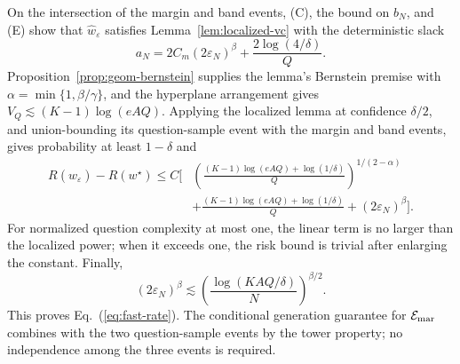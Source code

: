 On the intersection of the margin and band events, (C), the bound on \(b_N\),
and (E) show that
\(\widehat w_\varepsilon\) satisfies Lemma~\ref{lem:localized-vc} with the
deterministic slack
\[
a_N
=
2C_m(2\varepsilon_N)^\beta
+
\frac{2\log(4/\delta)}{Q}.
\]
Proposition~\ref{prop:geom-bernstein} supplies the lemma's Bernstein premise
with \(\alpha=\min\{1,\beta/\gamma\}\), and the hyperplane arrangement gives
\(V_Q\lesssim(K-1)\log(eAQ)\).  Applying the localized lemma at confidence
\(\delta/2\), and union-bounding its question-sample event with the margin and
band events, gives probability at least \(1-\delta\) and
\[
\begin{aligned}
R(\widehat w_\varepsilon)-R(w^\star)
\le C\Bigg[
&\left(
\frac{(K-1)\log(eAQ)+\log(1/\delta)}{Q}
\right)^{1/(2-\alpha)}\\
&+
\frac{(K-1)\log(eAQ)+\log(1/\delta)}{Q}
+
(2\varepsilon_N)^\beta
\Bigg].
\end{aligned}
\]
For normalized question complexity at most one, the linear term is no larger
than the localized power; when it exceeds one, the risk bound is trivial after
enlarging the constant.  Finally,
\[
(2\varepsilon_N)^\beta
\lesssim
\left(\frac{\log(KAQ/\delta)}{N}\right)^{\beta/2}.
\]
This proves Eq.~(\ref{eq:fast-rate}).  The conditional generation guarantee for
\(\mathcal E_{\rm mar}\) combines with the two question-sample events by the
tower property; no independence among the three events is required.
